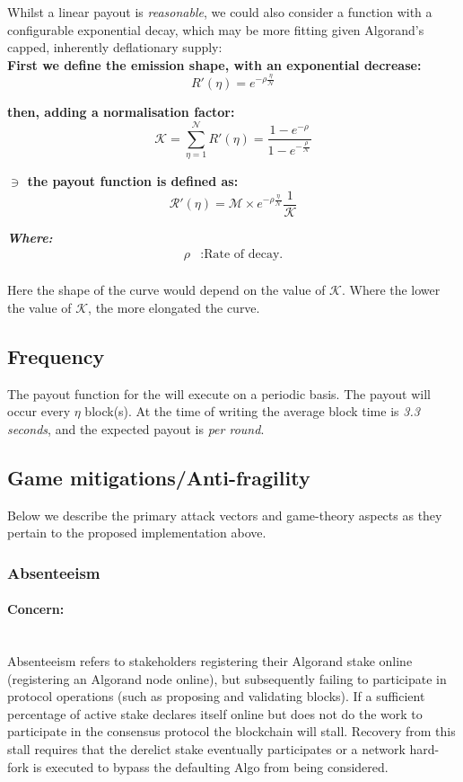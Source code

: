 \documentclass[11pt,a4paper]{article}
\begin{document}
Whilst a linear payout is \textit{reasonable}, we could also consider a function with a configurable exponential decay, 
which may be more fitting given Algorand's capped, inherently deflationary supply: \\ 

\textbf{First we define the emission shape, with an exponential decrease:}
\[
R'(\eta)= e^{-\rho\frac{\eta}{\mathcal{N}}}
\]

\textbf{then, adding a normalisation factor:}
\[
\mathcal{K} = \sum_{\eta=1}^\mathcal{N}R'(\eta)= \frac{1-e^{-\rho}}{1-e^{-\frac{\rho}{\mathcal{N}}}}
\]

\textbf{$\ni$ the payout function is defined as:}
\[
\mathcal{R'}(\eta)= \mathcal{M}\times e^{-\rho\frac{\eta}{\mathcal{N}}} \frac{1}{\mathcal{K}}
\]

\textbf{\emph{Where:}}
\begin{align*}
\rho & : \text{Rate of decay.} \\
\end{align*}


Here the shape of the curve would depend on the value of \(\mathcal{K}\). Where the lower the value of \(\mathcal{K}\), 
the more elongated the curve.

\subsection{Frequency}
The payout function for the  will execute on a periodic basis. The payout will occur every 
$\eta$ block(s). At the time of writing the average block time is \emph{3.3 seconds}, and the expected payout is 
\textit{per round}.

\subsection{Game mitigations/Anti-fragility}
Below we describe the primary attack vectors and game-theory aspects as they pertain to the proposed implementation 
above.

\subsubsection{Absenteeism} \label{subsubsec:absenteeism}

\paragraph{Concern:} \mbox{}\\
Absenteeism refers to stakeholders registering their Algorand stake online (registering an Algorand node online), but 
subsequently failing to participate in protocol operations (such as proposing and validating blocks). If a sufficient 
percentage of active stake declares itself online but does not do the work to participate in the consensus protocol the 
blockchain will stall. Recovery from this stall requires that the derelict stake eventually participates or a network 
hard-fork is executed to bypass the defaulting Algo from being considered. 
\end{document}
